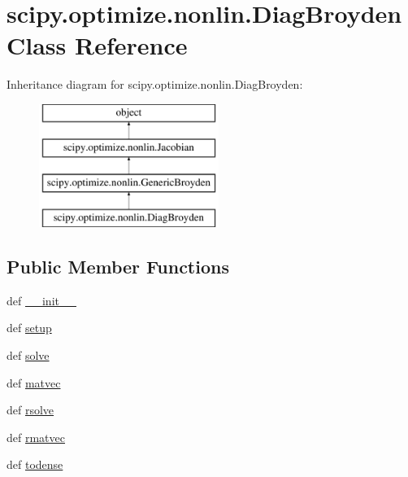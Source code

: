 \hypertarget{classscipy_1_1optimize_1_1nonlin_1_1DiagBroyden}{}\section{scipy.\+optimize.\+nonlin.\+Diag\+Broyden Class Reference}
\label{classscipy_1_1optimize_1_1nonlin_1_1DiagBroyden}
Inheritance diagram for scipy.\+optimize.\+nonlin.\+Diag\+Broyden\+:\begin{figure}[H]
\begin{center}
\leavevmode
\includegraphics[height=4.000000cm]{classscipy_1_1optimize_1_1nonlin_1_1DiagBroyden}
\end{center}
\end{figure}
\subsection*{Public Member Functions}
\begin{DoxyCompactItemize}
\item 
def \hyperlink{classscipy_1_1optimize_1_1nonlin_1_1DiagBroyden_a88e0b1ba932e07c4b6ec3a82c9b6d5bc}{\+\_\+\+\_\+init\+\_\+\+\_\+}
\item 
def \hyperlink{classscipy_1_1optimize_1_1nonlin_1_1DiagBroyden_a5f3b0de3c2b3e39f1dbae3cb44a0028f}{setup}
\item 
def \hyperlink{classscipy_1_1optimize_1_1nonlin_1_1DiagBroyden_aa81598601eacff6d495e029d73814c01}{solve}
\item 
def \hyperlink{classscipy_1_1optimize_1_1nonlin_1_1DiagBroyden_a889fa7e586985ba18bad6c744710c311}{matvec}
\item 
def \hyperlink{classscipy_1_1optimize_1_1nonlin_1_1DiagBroyden_a454b97c192225637280352781de7f9cf}{rsolve}
\item 
def \hyperlink{classscipy_1_1optimize_1_1nonlin_1_1DiagBroyden_a9f2cb6640dded1b6aeae8f6264eca77e}{rmatvec}
\item 
def \hyperlink{classscipy_1_1optimize_1_1nonlin_1_1DiagBroyden_ab5ed6b5bda519ccee6484197fcf47e13}{todense}
\end{DoxyCompactItemize}
